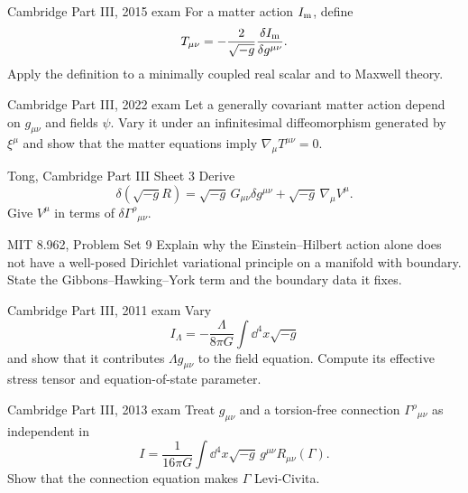 \begin{exercises}

\begin{exercise}{Cambridge Part III, 2015 exam}
For a matter action \(I_{\rm m}\), define
\[
T_{\mu\nu}=-\frac{2}{\sqrt{-g}}
\frac{\delta I_{\rm m}}{\delta g^{\mu\nu}}.
\]
Apply the definition to a minimally coupled real scalar and to Maxwell theory.
\end{exercise}

\begin{exercise}{Cambridge Part III, 2022 exam}
Let a generally covariant matter action depend on
\(g_{\mu\nu}\) and fields \(\psi\).  Vary it under an infinitesimal
diffeomorphism generated by \(\xi^\mu\) and show that the matter equations
imply \(\nabla_\mu T^{\mu\nu}=0\).
\end{exercise}

\begin{exercise}{Tong, Cambridge Part III Sheet 3}
Derive
\[
\delta(\sqrt{-g}R)
=\sqrt{-g}\,G_{\mu\nu}\delta g^{\mu\nu}
+\sqrt{-g}\,\nabla_\mu V^\mu.
\]
Give \(V^\mu\) in terms of \(\delta\Gamma^\rho{}_{\mu\nu}\).
\end{exercise}

\begin{exercise}{MIT 8.962, Problem Set 9}
Explain why the Einstein--Hilbert action alone does not have a well-posed
Dirichlet variational principle on a manifold with boundary.  State the
Gibbons--Hawking--York term and the boundary data it fixes.
\end{exercise}

\begin{exercise}{Cambridge Part III, 2011 exam}
Vary
\[
I_\Lambda=-\frac{\Lambda}{8\pi G}\int\dd^4x\sqrt{-g}
\]
and show that it contributes \(\Lambda g_{\mu\nu}\) to the field equation.
Compute its effective stress tensor and equation-of-state parameter.
\end{exercise}

\begin{exercise}{Cambridge Part III, 2013 exam}
Treat \(g_{\mu\nu}\) and a torsion-free connection
\(\Gamma^\rho{}_{\mu\nu}\) as independent in
\[
I=\frac1{16\pi G}\int\dd^4x\sqrt{-g}\,
g^{\mu\nu}R_{\mu\nu}(\Gamma).
\]
Show that the connection equation makes \(\Gamma\) Levi-Civita.
\end{exercise}


\end{exercises}
